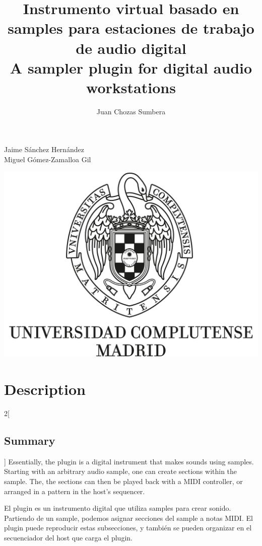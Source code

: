\documentclass[12pt , a4paper]{article}
\title{Instrumento virtual basado en samples para estaciones de trabajo de audio digital\\A sampler plugin for digital audio workstations}
\author{Juan Chozas Sumbera}
\begin{document}
	\maketitle
	\begin{center}
		Jaime Sánchez Hernández\\
		Miguel Gómez-Zamalloa Gil
				
		\includegraphics[width=\textwidth]{logo_UCM.jpg}
	\end{center}

	
	
	\newpage
	\tableofcontents
	
	\newpage
	\section{Description}

	\begin{multicols}{2}[\subsection{Summary}]
	Essentially, the plugin is a digital instrument that makes sounds using samples. Starting with an arbitrary audio sample, one can create sections within the sample. The, the sections can then be played back with a MIDI controller, or arranged in a pattern in the host's sequencer. 

	El plugin es un instrumento digital que utiliza samples para crear sonido. Partiendo de un sample, podemos asignar secciones del sample a notas MIDI. El plugin puede reproducir estas subsecciones, y también se pueden organizar en el secuenciador del host que carga el plugin.
	\end{multicols}
\end{document}
